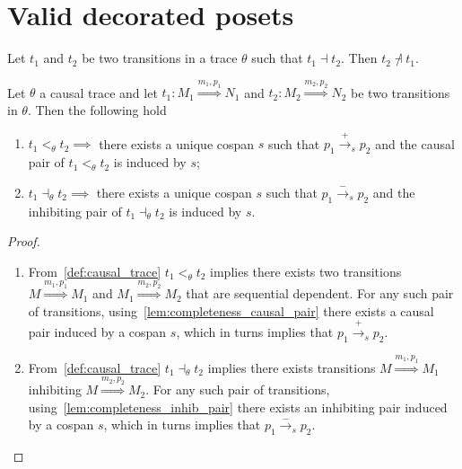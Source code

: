 \section{Valid decorated posets}
\label{sec:valid_decor}

\begin{lemma}
  \label{lem:inhibiting_pair}
  Let $t_1$ and $t_2$ be two transitions in a trace $\theta$ such that $t_1\dashv t_2$. Then $t_2\not\dashv t_1$.
\end{lemma}

\begin{lemma}
  \label{lemma:pos_infl}
  Let $\theta$ a causal trace and let $t_1:M_1\overset{m_1,p_1}{\Rightarrow}N_1$ and $t_2:M_2\overset{m_2,p_2}{\Rightarrow}N_2$ be two transitions in $\theta$. Then the following hold
  \begin{enumerate}
  \item $t_1 <_{\theta} t_2\implies$ there exists a unique cospan $s$ such that $p_1\xrightarrow{+}_s p_2$ and the causal pair of $t_1 <_{\theta} t_2$ is induced by $s$;
  \item $t_1\dashv_{\theta} t_2\implies$ there exists a unique cospan $s$ such that $p_1\xrightarrow{-}_s p_2$ and the inhibiting pair of $t_1\dashv_{\theta} t_2$ is induced by $s$.
  \end{enumerate}
\end{lemma}
\begin{proof}
  \begin{enumerate}
  \item From~\autoref{def:causal_trace} $t_1 <_{\theta} t_2$ implies there exists two transitions $M\overset{m_1,p_1}{\Rightarrow} M_1$ and $M_1\overset{m_2,p_2}{\Rightarrow} M_2$ that are sequential dependent. For any such pair of transitions, using~\autoref{lem:completeness_causal_pair} there exists a causal pair induced by a cospan $s$, which in turns implies that $p_1\xrightarrow{+}_{s}p_2$.

  \item From~\autoref{def:causal_trace} $t_1 \dashv_{\theta} t_2$ implies there exists transitions $M\overset{m_1,p_1}{\Rightarrow} M_1$ inhibiting $M\overset{m_2,p_2}{\Rightarrow} M_2$. For any such pair of transitions, using~\autoref{lem:completeness_inhib_pair} there exists an inhibiting pair induced by a cospan $s$, which in turns implies that $p_1\xrightarrow{-}_s p_2$.
  \end{enumerate}
\end{proof}

